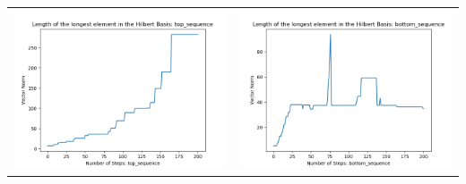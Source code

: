 \documentclass[10pt]{article}
\begin{document}
\begin{tabular}{c|c}
\begin{minipage}{.45\textwidth}
\includegraphics[width=\textwidth]{"DATA/5d/5 generators 2 bound F/top_sequence LENGTH"}
\end{minipage} &
\begin{minipage}{.45\textwidth}
\includegraphics[width=\textwidth]{"DATA/5d/5 generators 2 bound F bottomup/bottom_sequence LENGTH"}
\end{minipage}
\end{tabular}
\end{document}
